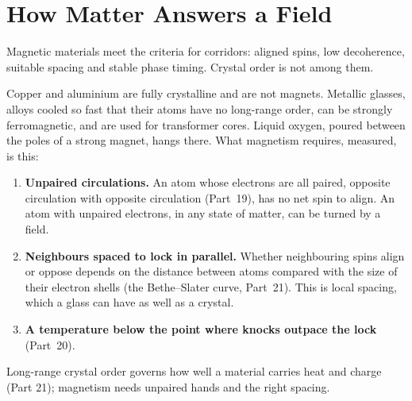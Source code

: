 \documentclass[11pt,a4paper]{article}
\begin{document}
\section{How Matter Answers a Field}
\label{sec:matter}

Magnetic materials meet the criteria for corridors: aligned spins, low decoherence, suitable spacing and stable phase timing. Crystal order is not among them.

 Copper and aluminium are fully crystalline and are not magnets. Metallic glasses, alloys cooled so fast that their atoms have no long-range order, can be strongly ferromagnetic, and are used for transformer cores. Liquid oxygen, poured between the poles of a strong magnet, hangs there. What magnetism requires, measured, is this:
\begin{enumerate}
\item \textbf{Unpaired circulations.} An atom whose electrons are all paired, opposite circulation with opposite circulation (Part~19), has no net spin to align. An atom with unpaired electrons, in any state of matter, can be turned by a field.
\item \textbf{Neighbours spaced to lock in parallel.} Whether neighbouring spins align or oppose depends on the distance between atoms compared with the size of their electron shells (the Bethe--Slater curve, Part~21). This is local spacing, which a glass can have as well as a crystal.
\item \textbf{A temperature below the point where knocks outpace the lock} (Part~20).
\end{enumerate}
 Long-range crystal order governs how well a material carries heat and charge (Part 21); magnetism needs unpaired hands and the right spacing.
\end{document}
